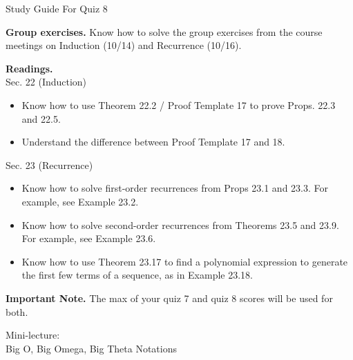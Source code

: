 \documentclass[10pt]{beamer}
\begin{document}
\begin{frame}{Study Guide For Quiz 8}
\footnotesize 

\colorbox{yellow!20}{\textbf{Group exercises.}} Know how to solve the group exercises from the course meetings on Induction (10/14) and Recurrence (10/16).


\vfill 

\colorbox{red!20}{\textbf{Readings.}}  \\
\vspace{.2cm}
Sec. 22 (Induction)
\begin{itemize}
\item Know how to use Theorem 22.2 / Proof Template 17 to prove Props. 22.3 and 22.5.
\item Understand the difference between Proof Template 17 and 18.
\end{itemize}
Sec. 23 (Recurrence)
\begin{itemize}
\item Know how to solve first-order recurrences from Props 23.1 and 23.3.  For example, see Example 23.2.
\item Know how to solve second-order recurrences from Theorems 23.5 and 23.9.  For example, see Example 23.6.
\item Know how to use Theorem 23.17 to find a polynomial expression to generate the first few terms of a sequence, as in Example 23.18.
\end{itemize}

\vfill 

\colorbox{green!20}{\textbf{Important Note.}} The max of your quiz 7 and quiz 8 scores will be used for both.
\end{frame}



\begin{frame}[standout]
Mini-lecture: \\
Big O, Big Omega, Big Theta Notations
\end{frame}
\end{document}
